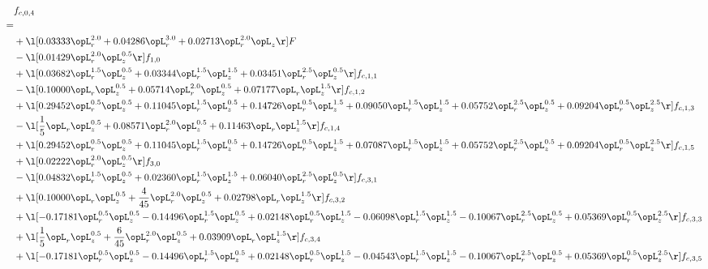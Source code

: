 \begin{alignat}{2} 
\label{eq:f_04_2} 
& f_{c,0,4} \nonumber \\ 
 = \\ 
& + \l[  0.03333 \opL_r^{2.0} +  0.04286 \opL_r^{3.0} +  0.02713 \opL_r^{2.0} \opL_z  \r] F \nonumber \\ 
& - \l[  0.01429 \opL_r^{2.0} \opL_z^{0.5}  \r] f_{1,0} \nonumber \\ 
& + \l[  0.03682 \opL_r^{1.5} \opL_z^{0.5} +  0.03344 \opL_r^{1.5} \opL_z^{1.5} +  0.03451 \opL_r^{2.5} \opL_z^{0.5}  \r] f_{c,1,1} \nonumber \\ 
& - \l[  0.10000 \opL_r \opL_z^{0.5} +  0.05714 \opL_r^{2.0} \opL_z^{0.5} +  0.07177 \opL_r \opL_z^{1.5}  \r] f_{c,1,2} \nonumber \\ 
& + \l[  0.29452 \opL_r^{0.5} \opL_z^{0.5} +  0.11045 \opL_r^{1.5} \opL_z^{0.5} +  0.14726 \opL_r^{0.5} \opL_z^{1.5} +  0.09050 \opL_r^{1.5} \opL_z^{1.5} +  0.05752 \opL_r^{2.5} \opL_z^{0.5} +  0.09204 \opL_r^{0.5} \opL_z^{2.5}  \r] f_{c,1,3} \nonumber \\ 
& - \l[ \frac{1}{5} \opL_r \opL_z^{0.5} +  0.08571 \opL_r^{2.0} \opL_z^{0.5} +  0.11463 \opL_r \opL_z^{1.5}  \r] f_{c,1,4} \nonumber \\ 
& + \l[  0.29452 \opL_r^{0.5} \opL_z^{0.5} +  0.11045 \opL_r^{1.5} \opL_z^{0.5} +  0.14726 \opL_r^{0.5} \opL_z^{1.5} +  0.07087 \opL_r^{1.5} \opL_z^{1.5} +  0.05752 \opL_r^{2.5} \opL_z^{0.5} +  0.09204 \opL_r^{0.5} \opL_z^{2.5}  \r] f_{c,1,5} \nonumber \\ 
& + \l[  0.02222 \opL_r^{2.0} \opL_z^{0.5}  \r] f_{3,0} \nonumber \\ 
& - \l[  0.04832 \opL_r^{1.5} \opL_z^{0.5} +  0.02360 \opL_r^{1.5} \opL_z^{1.5} +  0.06040 \opL_r^{2.5} \opL_z^{0.5}  \r] f_{c,3,1} \nonumber \\ 
& + \l[  0.10000 \opL_r \opL_z^{0.5} + \frac{4}{45} \opL_r^{2.0} \opL_z^{0.5} +  0.02798 \opL_r \opL_z^{1.5}  \r] f_{c,3,2} \nonumber \\ 
& + \l[  -0.17181 \opL_r^{0.5} \opL_z^{0.5}   -0.14496 \opL_r^{1.5} \opL_z^{0.5} +  0.02148 \opL_r^{0.5} \opL_z^{1.5}   -0.06098 \opL_r^{1.5} \opL_z^{1.5}   -0.10067 \opL_r^{2.5} \opL_z^{0.5} +  0.05369 \opL_r^{0.5} \opL_z^{2.5}  \r] f_{c,3,3} \nonumber \\ 
& + \l[ \frac{1}{5} \opL_r \opL_z^{0.5} + \frac{6}{45} \opL_r^{2.0} \opL_z^{0.5} +  0.03909 \opL_r \opL_z^{1.5}  \r] f_{c,3,4} \nonumber \\ 
& + \l[  -0.17181 \opL_r^{0.5} \opL_z^{0.5}   -0.14496 \opL_r^{1.5} \opL_z^{0.5} +  0.02148 \opL_r^{0.5} \opL_z^{1.5}   -0.04543 \opL_r^{1.5} \opL_z^{1.5}   -0.10067 \opL_r^{2.5} \opL_z^{0.5} +  0.05369 \opL_r^{0.5} \opL_z^{2.5}  \r] f_{c,3,5} \nonumber \\ 

\end{alignat}
